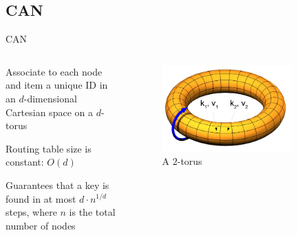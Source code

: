 
\subsection{CAN}

\begin{frame}{CAN}

\begin{columns}
\begin{column}{0.5\textwidth}
\BI
\item Associate to each node and item a unique ID in an $d$-dimensional Cartesian space on a $d$-torus
\item Routing table size is \alert{constant: $O(d)$}
\item Guarantees that a key is found in at most $d \cdot n^{1/d}$ steps, where $n$ is the total number of nodes	
\EI
\end{column}
\begin{column}{0.5\textwidth}
\begin{figure}
	\includegraphics[width=0.8\textwidth]{can-torus}
	\caption{A $2$-torus}
\end{figure}
\end{column}
\end{columns}

\begin{Bib}
{\scriptsize
}
\end{Bib}

\end{frame}

